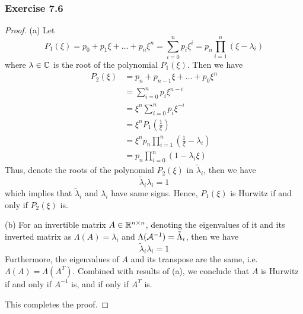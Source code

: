 \subsubsection{Exercise 7.6}
\begin{proof}
    
(a) Let 
\begin{equation}
    P_1(\xi) = p_0 + p_1\xi + \dots + p_n\xi^n = \sum_{i=0}^np_i\xi^i = p_n \prod_{i=1}^n(\xi-\lambda_i)
\end{equation}    
where $\lambda\in\mathbb{C}$ is the root of the polynomial $P_1(\xi)$. 
Then we have
\begin{equation}
    \begin{aligned}
        P_2(\xi) &= p_n + p_{n-1}\xi + \dots + p_0\xi^n \\
        &= \sum_{i=0}^np_i\xi^{n-i} \\
        &= \xi^n\sum_{i=0}^np_i\xi^{-i} \\ 
        &= \xi^nP_1(\frac{1}{\xi}) \\
        &= \xi^np_n \prod_{i=1}^n(\frac{1}{\xi}-\lambda_i) \\
        &= p_n\prod_{i=0}^n(1-\lambda_i\xi)
    \end{aligned}
\end{equation}
Thus, denote the roots of the polynomial $P_2(\xi)$ in $\tilde\lambda_i$, then we have
\begin{equation}
    \tilde\lambda_i\lambda_i = 1
\end{equation}
which implies that $\tilde\lambda_i$ and $\lambda_i$ have same signs. Hence, $P_1(\xi)$ is Hurwitz if and only if $P_2(\xi)$ is.

(b) For an invertible matrix $A\in\mathbb{R}^{n\times n}$, denoting the eigenvalues of it and its inverted matrix as $\Lambda(A) = \lambda_i$ and $\Lambda(\mathcal{A}^{-1})=\tilde\Lambda_i$, then we have
\begin{equation}
    \tilde\lambda_i\lambda_i = 1
\end{equation}
Furthermore, the eigenvalues of $A$ and its transpose are the same, i.e. $\Lambda(A) = \Lambda(A^T)$. Combined with results of (a), we conclude that $A$ is Hurwitz if and only if $A^{-1}$ is, and if only if $A^T$ is. 

This completes the proof.

\end{proof}


